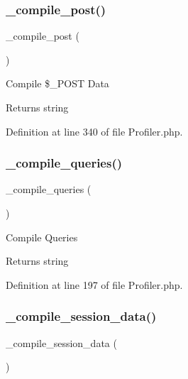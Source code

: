 \subsubsection{\texorpdfstring{\_compile\_post()}{\_compile\_post()}}
{\footnotesize\ttfamily \+\_\+compile\+\_\+post (\begin{DoxyParamCaption}{ }\end{DoxyParamCaption})\hspace{0.3cm}{\ttfamily [protected]}}

Compile \$\+\_\+\+P\+O\+ST Data

\begin{DoxyReturn}{Returns}
string 
\end{DoxyReturn}


Definition at line 340 of file Profiler.\+php.

\mbox{\label{class_c_i___profiler_a5d16e69fed0307c51b9479ebbb2049b6}} 
\subsubsection{\texorpdfstring{\_compile\_queries()}{\_compile\_queries()}}
{\footnotesize\ttfamily \+\_\+compile\+\_\+queries (\begin{DoxyParamCaption}{ }\end{DoxyParamCaption})\hspace{0.3cm}{\ttfamily [protected]}}

Compile Queries

\begin{DoxyReturn}{Returns}
string 
\end{DoxyReturn}


Definition at line 197 of file Profiler.\+php.

\mbox{\label{class_c_i___profiler_a65f7d92ff03632e35cd506dd500a2dd7}} 
\subsubsection{\texorpdfstring{\_compile\_session\_data()}{\_compile\_session\_data()}}
{\footnotesize\ttfamily \+\_\+compile\+\_\+session\+\_\+data (\begin{DoxyParamCaption}{ }\end{DoxyParamCaption})\hspace{0.3cm}{\ttfamily [protected]}}

